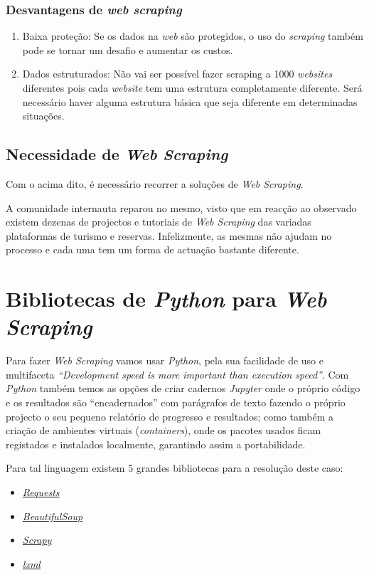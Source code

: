 \subsubsection{Desvantagens de \textit{web scraping}}

\begin{enumerate}
  \item Baixa proteção: Se os dados na \textit{web} são protegidos, o uso do \textit{scraping} também pode se tornar um desafio e aumentar os custos.
  \item Dados estruturados: Não vai ser possível fazer scraping a 1000 \textit{websites} diferentes pois cada \textit{website} tem uma estrutura completamente diferente. Será necessário haver alguma estrutura básica que seja diferente em determinadas situações.
\end{enumerate}

\subsection{Necessidade de \textit{Web Scraping}}

Com o acima dito, é necessário recorrer a soluções de \textit{Web Scraping}.

A comunidade internauta reparou no mesmo, visto que em reacção ao observado existem dezenas de projectos e tutoriais de \textit{Web Scraping} das variadas plataformas de turismo e reservas.
Infelizmente, as mesmas não ajudam no processo e cada uma tem um forma de actuação bastante diferente.

\section{Bibliotecas de \textit{Python} para \textit{Web Scraping}}

Para fazer \textit{Web Scraping} vamos usar \textit{Python}, pela sua facilidade de uso e multifaceta \textit{``Development speed is more important than execution speed''}.
Com \textit{Python} também temos as opções de criar cadernos \textit{Jupyter} onde o próprio código e os resultados são ``encadernados'' com parágrafos de texto fazendo o próprio projecto o seu pequeno relatório de progresso e resultados; como também a criação de ambientes virtuais (\textit{containers}), onde os pacotes usados ficam registados e instalados localmente, garantindo assim a portabilidade.

Para tal linguagem existem 5 grandes bibliotecas para a resolução deste caso:
\begin{itemize}
  \item \textit{\href{https://pypi.org/project/requests/}{Requests}}
  \item \textit{\href{https://pypi.org/project/BeautifulSoup/}{BeautifulSoup}}
  \item \textit{\href{https://pypi.org/project/Scrapy3/}{Scrapy}}
  \item \textit{\href{https://pypi.org/project/lxml/}{lxml}}
\end{itemize}

